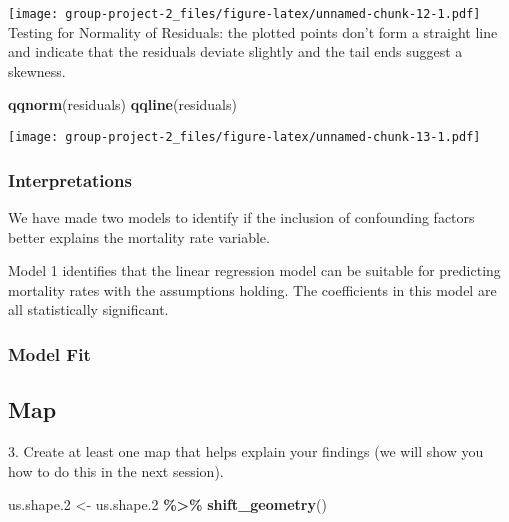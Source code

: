\documentclass[
]{article}
\newenvironment{Shaded}{\begin{snugshade}}{\end{snugshade}}
\newcommand{\FloatTok}[1]{\textcolor[rgb]{0.00,0.00,0.81}{#1}}
\newcommand{\FunctionTok}[1]{\textcolor[rgb]{0.13,0.29,0.53}{\textbf{#1}}}
\newcommand{\NormalTok}[1]{#1}
\newcommand{\OtherTok}[1]{\textcolor[rgb]{0.56,0.35,0.01}{#1}}
\newcommand{\SpecialCharTok}[1]{\textcolor[rgb]{0.81,0.36,0.00}{\textbf{#1}}}
\begin{document}
\texttt{[image: group-project-2\_files/figure-latex/unnamed-chunk-12-1.pdf]}
Testing for Normality of Residuals: the plotted points don't form a
straight line and indicate that the residuals deviate slightly and the
tail ends suggest a skewness.

\begin{Shaded}
\begin{Highlighting}[]
\FunctionTok{qqnorm}\NormalTok{(residuals)}
\FunctionTok{qqline}\NormalTok{(residuals)}
\end{Highlighting}
\end{Shaded}

\texttt{[image: group-project-2\_files/figure-latex/unnamed-chunk-13-1.pdf]}

\hypertarget{interpretations}{%
\subsubsection{Interpretations}\label{interpretations}}

We have made two models to identify if the inclusion of confounding
factors better explains the mortality rate variable.

Model 1 identifies that the linear regression model can be suitable for
predicting mortality rates with the assumptions holding. The
coefficients in this model are all statistically significant.

\hypertarget{model-fit}{%
\subsubsection{Model Fit}\label{model-fit}}

\hypertarget{map}{%
\subsection{Map}\label{map}}

3. Create at least one map that helps explain your findings (we will
show you how to do this in the next session).

\begin{Shaded}
\begin{Highlighting}[]
\NormalTok{us.shape}\FloatTok{.2} \OtherTok{\textless{}{-}}\NormalTok{ us.shape}\FloatTok{.2} \SpecialCharTok{\%\textgreater{}\%}
  \FunctionTok{shift\_geometry}\NormalTok{()}
\end{Highlighting}
\end{Shaded}
\end{document}

